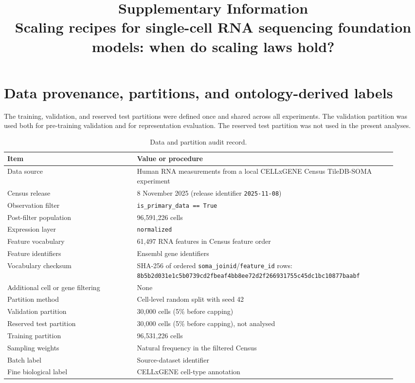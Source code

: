 \documentclass[11pt]{article}
\title{Supplementary Information\\[0.4em]
\large Scaling recipes for single-cell RNA sequencing foundation models: when do scaling laws hold?}
\author{}
\date{}
\begin{document}
\maketitle
\vspace{-3em}
\tableofcontents
\clearpage


\section{Data provenance, partitions, and ontology-derived labels}
\label{sec:supp-data}

The training, validation, and reserved test partitions were defined once and shared across all experiments.
The validation partition was used both for pre-training validation and for representation evaluation.
The reserved test partition was not used in the present analyses.

\begin{table}[ht]
\centering
\caption{Data and partition audit record.}
\label{tab:supp-data-audit}
\small
\begin{tabular}{p{0.31\linewidth}p{0.62\linewidth}}
\toprule
Item & Value or procedure \\
\midrule
Data source & Human RNA measurements from a local CELLxGENE Census TileDB-SOMA experiment \\
Census release & 8 November 2025 (release identifier \texttt{2025-11-08}) \\
Observation filter & \texttt{is\_primary\_data == True} \\
Post-filter population & 96,591,226 cells \\
Expression layer & \texttt{normalized} \\
Feature vocabulary & 61,497 RNA features in Census feature order \\
Feature identifiers & Ensembl gene identifiers \\
Vocabulary checksum & SHA-256 of ordered \texttt{soma\_joinid}/\texttt{feature\_id} rows: \texttt{8b5b2d031e1c5b07\allowbreak39cd2fbeaf4bb8ee\allowbreak72d2f266931755c4\allowbreak5dc1bc10877baabf} \\
Additional cell or gene filtering & None \\
Partition method & Cell-level random split with seed 42 \\
Validation partition & 30,000 cells (5\% before capping) \\
Reserved test partition & 30,000 cells (5\% before capping), not analysed \\
Training partition & 96,531,226 cells \\
Sampling weights & Natural frequency in the filtered Census \\
Batch label & Source-dataset identifier \\
Fine biological label & CELLxGENE cell-type annotation \\
\bottomrule
\end{tabular}
\end{table}
\end{document}
